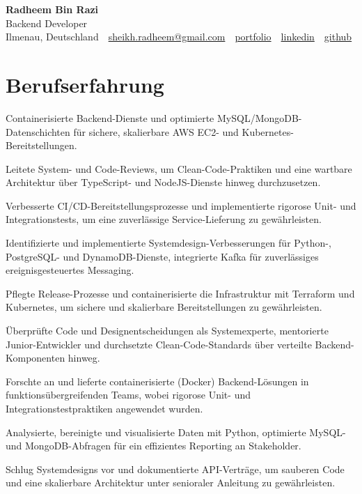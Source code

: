 \documentclass[11pt,a4paper]{resume}
\makeatletter
\newcommand{\Portfolio}{https://radheem.github.io/my-cv}
\newcommand{\PortfolioText}{portfolio}
\newcommand{\GitHub}{https://github.com/radheem}
\newcommand{\LinkedIn}{https://www.linkedin.com/in/radheem-razi}
\newcommand{\Email}{sheikh.radheem@gmail.com}
\makeatother
\begin{document}
\clearpage
{}

\begin{center}
  {\huge\bfseries Radheem Bin Razi}\\[3pt]
  {\large Backend Developer}\\[6pt]
  \small
  Ilmenau, Deutschland \,\textbar\,
  \href{mailto:\Email}{\Email} \,\textbar\,
  \href{\Portfolio}{\PortfolioText} \,\textbar\,
  \href{\LinkedIn}{linkedin} \,\textbar\,
  \href{\GitHub}{github}
\end{center}
\vspace{2pt}

\section{Berufserfahrung}

\bullets
  \item Containerisierte Backend-Dienste und optimierte MySQL/MongoDB-Datenschichten für sichere, skalierbare AWS EC2- und Kubernetes-Bereitstellungen.
  \item Leitete System- und Code-Reviews, um Clean-Code-Praktiken und eine wartbare Architektur über TypeScript- und NodeJS-Dienste hinweg durchzusetzen.
  \item Verbesserte CI/CD-Bereitstellungsprozesse und implementierte rigorose Unit- und Integrationstests, um eine zuverlässige Service-Lieferung zu gewährleisten.
\bulletsend
\vspace{3pt}
\bullets
  \item Identifizierte und implementierte Systemdesign-Verbesserungen für Python-, PostgreSQL- und DynamoDB-Dienste, integrierte Kafka für zuverlässiges ereignisgesteuertes Messaging.
  \item Pflegte Release-Prozesse und containerisierte die Infrastruktur mit Terraform und Kubernetes, um sichere und skalierbare Bereitstellungen zu gewährleisten.
  \item Überprüfte Code und Designentscheidungen als Systemexperte, mentorierte Junior-Entwickler und durchsetzte Clean-Code-Standards über verteilte Backend-Komponenten hinweg.
\bulletsend
\vspace{3pt}
\bullets
  \item Forschte an und lieferte containerisierte (Docker) Backend-Lösungen in funktionsübergreifenden Teams, wobei rigorose Unit- und Integrationstestpraktiken angewendet wurden.
  \item Analysierte, bereinigte und visualisierte Daten mit Python, optimierte MySQL- und MongoDB-Abfragen für ein effizientes Reporting an Stakeholder.
  \item Schlug Systemdesigns vor und dokumentierte API-Verträge, um sauberen Code und eine skalierbare Architektur unter senioraler Anleitung zu gewährleisten.
\bulletsend
\vspace{3pt}
\end{document}

